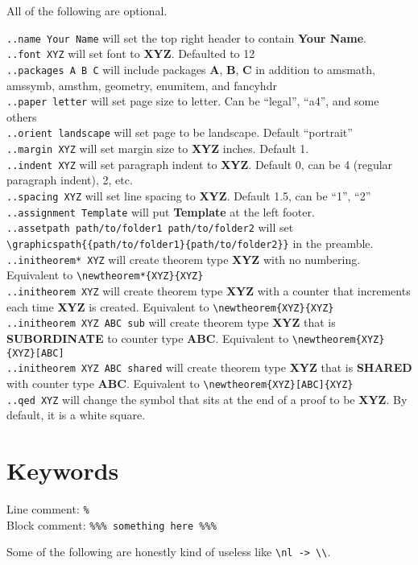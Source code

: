 \documentclass[12pt]{article}
\newcommand{\nl}{\\}
\renewcommand\bold{\textbf}
\begin{document}
\begin{flushleft}
\bigskip
\bigskip

All of the following are optional.

\verb|..name Your Name| will set the top right header to contain \bold{Your Name}. \nl
\verb|..font XYZ| will set font to \bold{XYZ}. Defaulted to 12 \nl
\verb|..packages A B C| will include packages \bold{A}, \bold{B}, \bold{C} in addition to amsmath, amssymb, amsthm, geometry, enumitem, and fancyhdr \nl
\verb|..paper letter| will set page size to letter. Can be ``legal'', ``a4'', and some others\nl
\verb|..orient landscape| will set page to be landscape. Default ``portrait''\nl
\bigskip
\verb|..margin XYZ| will set margin size to \bold{XYZ} inches. Default 1.\nl
\verb|..indent XYZ| will set paragraph indent to \bold{XYZ}. Default 0, can be 4 (regular paragraph indent), 2, etc. \nl
\verb|..spacing XYZ| will set line spacing to \bold{XYZ}. Default 1.5, can be ``1'', ``2''\nl
\verb|..assignment Template| will put \bold{Template} at the left footer. \nl
\verb|..assetpath path/to/folder1 path/to/folder2| will set \verb|\graphicspath{{path/to/folder1}{path/to/folder2}}| in the preamble. \nl
\bigskip
\verb|..initheorem* XYZ| will create theorem type \bold{XYZ} with no numbering. Equivalent to \verb|\newtheorem*{XYZ}{XYZ}|\nl
\verb|..initheorem XYZ| will create theorem type \bold{XYZ} with a counter that increments each time \bold{XYZ} is created. Equivalent to \verb|\newtheorem{XYZ}{XYZ}|\nl
\verb|..initheorem XYZ ABC sub| will create theorem type \bold{XYZ} that is \bold{SUBORDINATE} to counter type \bold{ABC}. Equivalent to \verb|\newtheorem{XYZ}{XYZ}[ABC]|\nl
\verb|..initheorem XYZ ABC shared| will create theorem type \bold{XYZ} that is \bold{SHARED} with counter type \bold{ABC}. Equivalent to \verb|\newtheorem{XYZ}[ABC]{XYZ}|\nl
\verb|..qed XYZ| will change the symbol that sits at the end of a proof to be \bold{XYZ}. By default, it is a white square.

\newpage

\section*{Keywords}

Line comment: \verb|%|\nl
Block comment: \verb|%|\verb|%|\verb|%|\verb| something here |\verb|%|\verb|%|\verb|%|

\medskip

Some of the following are honestly kind of useless like \verb|\nl -> \\|.


\end{flushleft}
\end{document}
